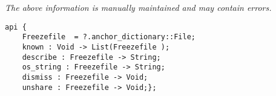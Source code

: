 \label{pkg:freezefile\_db}

{\tiny \it The above information is manually maintained and may contain errors.}
\begin{verbatim}
api {
    Freezefile  = ?.anchor_dictionary::File;
    known : Void -> List(Freezefile );
    describe : Freezefile -> String;
    os_string : Freezefile -> String;
    dismiss : Freezefile -> Void;
    unshare : Freezefile -> Void;};
\end{verbatim}
